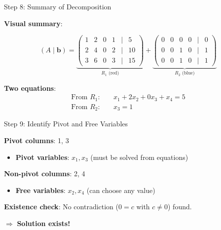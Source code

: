 \documentclass[10pt]{beamer}
\theoremstyle{definition}
\newcommand{\x}[1]{\alert{\textbf{#1}}}
\begin{document}
\begin{frame}{Step 8: Summary of Decomposition}

\x{Visual summary}:

$$(A \mid \mathbf{b}) = \underbrace{\begin{pmatrix}
1 & 2 & 0 & 1 & | & 5 \\
2 & 4 & 0 & 2 & | & 10 \\
3 & 6 & 0 & 3 & | & 15
\end{pmatrix}}_{R_1 \text{ (red)}} + \underbrace{\begin{pmatrix}
0 & 0 & 0 & 0 & | & 0 \\
0 & 0 & 1 & 0 & | & 1 \\
0 & 0 & 1 & 0 & | & 1
\end{pmatrix}}_{R_2 \text{ (blue)}}$$

\vspace{1em}

\x{Two equations}:
\begin{align*}
\text{From } R_1: & \quad x_1 + 2x_2 + 0x_3 + x_4 = 5 \\
\text{From } R_2: & \quad x_3 = 1
\end{align*}

\end{frame}

\begin{frame}{Step 9: Identify Pivot and Free Variables}

\x{Pivot columns}: 1, 3

\begin{itemize}
\item \x{Pivot variables}: $x_1, x_3$ (must be solved from equations)
\end{itemize}

\vspace{1em}

\x{Non-pivot columns}: 2, 4

\begin{itemize}
\item \x{Free variables}: $x_2, x_4$ (can choose any value)
\end{itemize}

\vspace{1em}

\x{Existence check}: No contradiction ($0 = c$ with $c \neq 0$) found.

$\Rightarrow$ \textbf{Solution exists!}

\end{frame}
\end{document}
